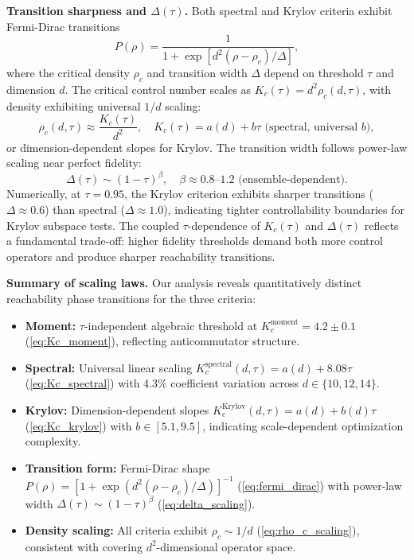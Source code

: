 \documentclass[aps,prx,reprint,superscriptaddress,footnote, twocolumn,notitlepage]{revtex4-2}
\begin{document}
\textbf{Transition sharpness and $\Delta(\tau)$.} Both spectral and Krylov criteria exhibit Fermi-Dirac transitions
\begin{equation}
P(\rho) = \frac{1}{1 + \exp[d^2(\rho - \rho_c)/\Delta]}, \label{eq:fermi_dirac}
\end{equation}
where the critical density $\rho_c$ and transition width $\Delta$ depend on threshold $\tau$ and dimension $d$. The critical control number scales as $K_c(\tau) = d^2 \rho_c(d,\tau)$, with density exhibiting universal $1/d$ scaling:
\begin{equation}
\rho_c(d,\tau) \approx \frac{K_c(\tau)}{d^2}, \quad K_c(\tau) = a(d) + b\tau \text{ (spectral, universal $b$)}, \label{eq:rho_c_scaling}
\end{equation}
or dimension-dependent slopes for Krylov. The transition width follows power-law scaling near perfect fidelity:
\begin{equation}
\Delta(\tau) \sim (1-\tau)^\beta, \quad \beta \approx 0.8 \text{--} 1.2 \text{ (ensemble-dependent)}. \label{eq:delta_scaling}
\end{equation}
Numerically, at $\tau = 0.95$, the Krylov criterion exhibits sharper transitions ($\Delta \approx 0.6$) than spectral ($\Delta \approx 1.0$), indicating tighter controllability boundaries for Krylov subspace tests. The coupled $\tau$-dependence of $K_c(\tau)$ and $\Delta(\tau)$ reflects a fundamental trade-off: higher fidelity thresholds demand both more control operators and produce sharper reachability transitions.

\textbf{Summary of scaling laws.} Our analysis reveals quantitatively distinct reachability phase transitions for the three criteria:
\begin{itemize}[leftmargin=1.5em]
\item \textbf{Moment:} $\tau$-independent algebraic threshold at $K_c^{\text{moment}} = 4.2 \pm 0.1$ (\ref{eq:Kc_moment}), reflecting anticommutator structure.
\item \textbf{Spectral:} Universal linear scaling $K_c^{\text{spectral}}(d,\tau) = a(d) + 8.08\tau$ (\ref{eq:Kc_spectral}) with 4.3\% coefficient variation across $d \in \{10, 12, 14\}$.
\item \textbf{Krylov:} Dimension-dependent slopes $K_c^{\text{Krylov}}(d,\tau) = a(d) + b(d)\tau$ (\ref{eq:Kc_krylov}) with $b \in [5.1, 9.5]$, indicating scale-dependent optimization complexity.
\item \textbf{Transition form:} Fermi-Dirac shape $P(\rho) = [1 + \exp(d^2(\rho - \rho_c)/\Delta)]^{-1}$ (\ref{eq:fermi_dirac}) with power-law width $\Delta(\tau) \sim (1-\tau)^\beta$ (\ref{eq:delta_scaling}).
\item \textbf{Density scaling:} All criteria exhibit $\rho_c \sim 1/d$ (\ref{eq:rho_c_scaling}), consistent with covering $d^2$-dimensional operator space.
\end{itemize}
\end{document}
